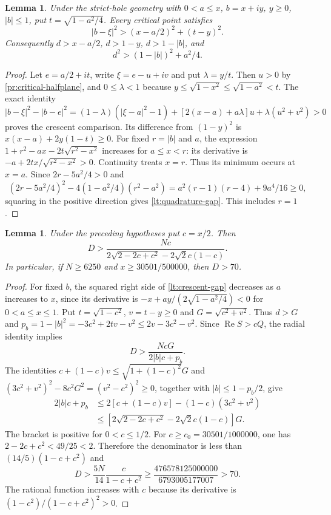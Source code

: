 \documentclass[11pt,reqno]{amsart}
\numberwithin{equation}{section}
\newtheorem{lemma}[theorem]{Lemma}
\theoremstyle{definition}
\theoremstyle{remark}
\renewcommand{\Re}{\operatorname{Re}}
\begin{document}
\begin{lemma}\label{lt:crescent}
Under the strict-hole geometry with $0<a\le x$, $b=x+iy$,
$y\ge0$, $|b|\le1$, put $t=\sqrt{1-a^2/4}$.
Every critical point satisfies
\begin{equation}\label{lt:crescent-gap}
 |b-\xi|^2>(x-a/2)^2+(t-y)^2.
\end{equation}
Consequently $d>x-a/2$, $d>1-y$, $d>1-|b|$, and
\begin{equation}\label{lt:quadrature-gap}
 d^2>(1-|b|)^2+a^2/4.
\end{equation}
\end{lemma}
\begin{proof}
Let $e=a/2+it$, write $\xi=e-u+iv$ and put $\lambda=y/t$.
Then $u>0$ by \eqref{pr:critical-halfplane}, and $0\le\lambda<1$
because $y\le\sqrt{1-x^2}\le\sqrt{1-a^2}<t$.
The exact identity
\[
 |b-\xi|^2-|b-e|^2
 =(1-\lambda)(|\xi-a|^2-1)
       +[2(x-a)+a\lambda]u+\lambda(u^2+v^2)>0
\]
proves the crescent comparison. Its difference from
$(1-y)^2$ is $x(x-a)+2y(1-t)\ge0$.
For fixed $r=|b|$ and $a$, the expression
$1+r^2-ax-2t\sqrt{r^2-x^2}$ increases for $a\le x<r$:
its derivative is $-a+2tx/\sqrt{r^2-x^2}>0$.
Continuity treats $x=r$. Thus its minimum occurs at $x=a$.
Since $2r-5a^2/4>0$ and
\[
 (2r-5a^2/4)^2-4(1-a^2/4)(r^2-a^2)
       =a^2(r-1)(r-4)+9a^4/16\ge0,
\]
squaring in the positive direction gives
\eqref{lt:quadrature-gap}. This includes $r=1$.
\end{proof}

\begin{lemma}\label{lt:direct-D70}
Under the preceding hypotheses put $c=x/2$. Then
\[
 D>\frac{Nc}{2\sqrt{2-2c+c^2}-2\sqrt2c(1-c)}.
\]
In particular, if $N\ge6250$ and $x\ge30501/500000$, then $D>70$.
\end{lemma}
\begin{proof}
For fixed $b$, the squared right side of \eqref{lt:crescent-gap}
decreases as $a$ increases to $x$, since its derivative is
$-x+ay/(2\sqrt{1-a^2/4})<0$ for $0<a\le x\le1$.
Put $t=\sqrt{1-c^2}$, $v=t-y\ge0$ and $G=\sqrt{c^2+v^2}$.
Thus $d>G$ and $p_b=1-|b|^2=-3c^2+2tv-v^2\le2v-3c^2-v^2$.
Since $\Re S>cQ$, the radial identity implies
\[
 D>\frac{NcG}{2|b|c+p_b}.
\]
The identities
$c+(1-c)v\le\sqrt{1+(1-c)^2}G$ and
$(3c^2+v^2)^2-8c^2G^2=(v^2-c^2)^2\ge0$,
together with $|b|\le1-p_b/2$, give
\begin{align*}
 2|b|c+p_b&\le2[c+(1-c)v]-(1-c)(3c^2+v^2)\\
 &\le
 [2\sqrt{2-2c+c^2}-2\sqrt2c(1-c)]G.
\end{align*}
The bracket is positive for $0<c\le1/2$.
For $c\ge c_0=30501/1000000$, one has
$2-2c+c^2<49/25<2$. Therefore the denominator is less than
$(14/5)(1-c+c^2)$ and
\[
 D>\frac{5N}{14}\frac{c}{1-c+c^2}
 \ge\frac{476578125000000}{6793005177007}>70.
\]
The rational function increases with $c$ because its derivative is
$(1-c^2)/(1-c+c^2)^2>0$.
\end{proof}
\end{document}
